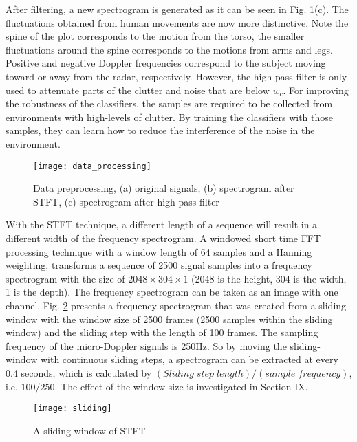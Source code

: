 After filtering, a new spectrogram is generated as it can be seen in Fig. \ref{fig_dp}(c). The fluctuations obtained from human movements are now more distinctive. Note the spine of the plot corresponds to the motion from the torso, the smaller fluctuations around the spine corresponds to the motions from arms and legs. Positive and negative Doppler frequencies correspond to the subject moving toward or away from the radar, respectively. However, the high-pass filter is only used to attenuate parts of the clutter and noise that are below $w_c$. For improving the robustness of the classifiers, the samples are required to be collected from environments with high-levels of clutter. By training the classifiers with those samples, they can learn how to reduce the interference of the noise in the environment.
\begin{figure}[!t]
\centering
\texttt{[image: data\_processing]}
\caption{Data preprocessing, (a) original signals, (b) spectrogram after STFT, (c) spectrogram after high-pass filter}
\label{fig_dp}
\end{figure}

With the STFT technique, a different length of a sequence will result in a different width of the frequency spectrogram. A windowed short time FFT processing technique with a window length of 64 samples and a Hanning weighting, transforms a sequence of 2500 signal samples into a frequency spectrogram with the size of $2048\times 304\times 1$ (2048 is the height, 304 is the width, 1 is the depth). The frequency spectrogram can be taken as an image with one channel. Fig. \ref{fig_sliding} presents a frequency spectrogram that was created from a sliding-window with the window size of 2500 frames (2500 samples within the sliding window) and the sliding step with the length of 100 frames. The sampling frequency of the micro-Doppler signals is 250Hz. So by moving the sliding-window with continuous sliding steps, a spectrogram can be extracted at every 0.4 seconds, which is calculated by $(Sliding\; step \;length)/(sample\; frequency)$, i.e. $100/250$. The effect of the window size is investigated in Section IX.
\begin{figure}[!t]
\centering
\texttt{[image: sliding]}
\caption{A sliding window of STFT}
\label{fig_sliding}
\end{figure}

